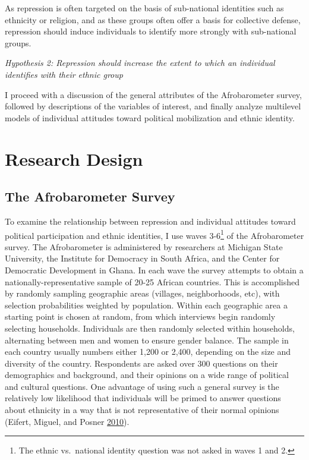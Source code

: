 \documentclass[12pt,]{book}
\let\rmarkdownfootnote\footnote%
\def\footnote{\protect\rmarkdownfootnote}
\theoremstyle{definition}
\theoremstyle{definition}
\theoremstyle{definition}
\theoremstyle{remark}
\begin{document}
As repression is often targeted on the basis of sub-national identities
such as ethnicity or religion, and as these groups often offer a basis
for collective defense, repression should induce individuals to identify
more strongly with sub-national groups.

\emph{Hypothesis 2: Repression should increase the extent to which an
individual identifies with their ethnic group}

I proceed with a discussion of the general attributes of the
Afrobarometer survey, followed by descriptions of the variables of
interest, and finally analyze multilevel models of individual attitudes
toward political mobilization and ethnic identity.

\hypertarget{research-design}{%
\section{Research Design}\label{research-design}}

\hypertarget{the-afrobarometer-survey}{%
\subsection{The Afrobarometer Survey}\label{the-afrobarometer-survey}}

To examine the relationship between repression and individual attitudes
toward political participation and ethnic identities, I use waves
3-6\footnote{The ethnic vs.~national identity question was not asked in
  waves 1 and 2.} of the Afrobarometer survey. The Afrobarometer is
administered by researchers at Michigan State University, the Institute
for Democracy in South Africa, and the Center for Democratic Development
in Ghana. In each wave the survey attempts to obtain a
nationally-representative sample of 20-25 African countries. This is
accomplished by randomly sampling geographic areas (villages,
neighborhoods, etc), with selection probabilities weighted by
population. Within each geographic area a starting point is chosen at
random, from which interviews begin randomly selecting households.
Individuals are then randomly selected within households, alternating
between men and women to ensure gender balance. The sample in each
country usually numbers either 1,200 or 2,400, depending on the size and
diversity of the country. Respondents are asked over 300 questions on
their demographics and background, and their opinions on a wide range of
political and cultural questions. One advantage of using such a general
survey is the relatively low likelihood that individuals will be primed
to answer questions about ethnicity in a way that is not representative
of their normal opinions (Eifert, Miguel, and Posner
\protect\hyperlink{ref-Eifert2010}{2010}).
\end{document}
